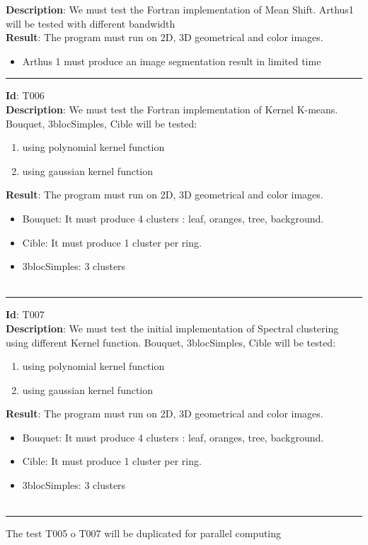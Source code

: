 \textbf{Description}: We must test the Fortran implementation of Mean Shift. Arthus1 will be tested with different bandwidth\\

\textbf{Result}: The program must run on 2D, 3D geometrical and color images.
\begin{itemize}
\item Arthus 1 must produce an image segmentation result in limited time\\
\end{itemize}
\hrule
\vspace{0.2cm}
\textbf{Id}: T006\\

\textbf{Description}: We must test the Fortran implementation of Kernel K-means. Bouquet, 3blocSimples, Cible will be tested:
\begin{enumerate}
\item using polynomial kernel function
\item using gaussian kernel function\\
\end{enumerate}

\textbf{Result}: The program must run on 2D, 3D geometrical and color images.
\begin{itemize}
\item Bouquet: It must produce 4 clusters : leaf, oranges, tree, background.
\item Cible: It must produce 1 cluster per ring.
\item 3blocSimples: 3 clusters\\\\
\end{itemize}
\hrule
\vspace{0.2cm}
\textbf{Id}: T007\\

\textbf{Description}: We must test the initial implementation of Spectral clustering using different Kernel function. Bouquet, 3blocSimples, Cible will be tested: 
\begin{enumerate}
\item using polynomial kernel function
\item using gaussian kernel function\\
\end{enumerate}

\textbf{Result}: The program must run on 2D, 3D geometrical and color images.
\begin{itemize}
\item Bouquet: It must produce 4 clusters : leaf, oranges, tree, background.
\item Cible: It must produce 1 cluster per ring.
\item 3blocSimples: 3 clusters\\\\
\end{itemize}
\hrule
\vspace{0.2cm}
The test T005 o T007 will be duplicated for parallel computing\\

